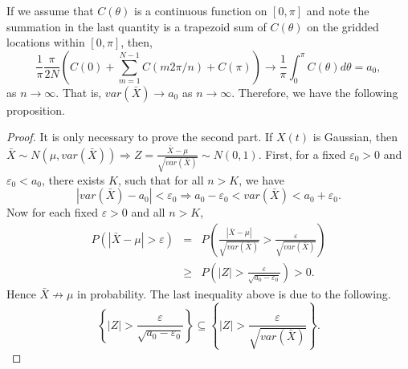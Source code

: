 If we assume that $C(\theta)$ is a continuous function on $[0, \pi]$ and note the summation in the last quantity is a trapezoid sum of $C(\theta)$ on the gridded locations within $[0, \pi]$, then,
\[
\frac{1}{\pi} \frac{\pi}{2 N} \left(C(0) + \sum_{m=1}^{N-1}C(m 2\pi/n) + C(\pi) \right) \to \frac{1}{\pi} \int_0^\pi C(\theta)d\theta = a_0,
\]
as $n \to \infty$. That is, $var(\bar{X}) \to a_0$ as $n \to \infty$. Therefore, we have the following proposition.


\begin{proof}
It is only necessary to prove the second part. If $X(t)$ is Gaussian, then $\bar{X} \sim N(\mu, var(\bar{X})) \Rightarrow Z = \frac{\bar{X} - \mu}{\sqrt{var(\bar{X})}} \sim N(0, 1)$. First, for a fixed $\varepsilon_0 > 0$ and $\varepsilon_0 < a_0$, there exists $K$, such that for all $n > K$, we have
\[
|var(\bar{X}) - a_0| < \varepsilon_0 \Rightarrow a_0 - \varepsilon_0 < var(\bar{X}) < a_0 + \varepsilon_0.
\]
Now for each fixed $\varepsilon > 0$ and all $n > K$,
\begin{eqnarray*}
P\left(|\bar{X} - \mu| > \varepsilon\right) &=& P\left(\frac{|\bar{X} - \mu|}{\sqrt{var(\bar{X})}} > \frac{\varepsilon}{\sqrt{var(\bar{X})}} \right) \\
&\ge& P\left(|Z| > \frac{\varepsilon}{\sqrt{a_0 - \varepsilon_0}} \right) > 0.
\end{eqnarray*}
Hence $\bar{X} \not\to \mu$ in probability. The last inequality above is due to the following.
\[
\left\{|Z| > \frac{\varepsilon}{\sqrt{a_0 - \varepsilon_0}} \right\} \subseteq \left\{|Z| > \frac{\varepsilon}{\sqrt{var(\bar{X})}}\right\}.
\]

\end{proof}


\vskip 8pt


\vskip 8pt



